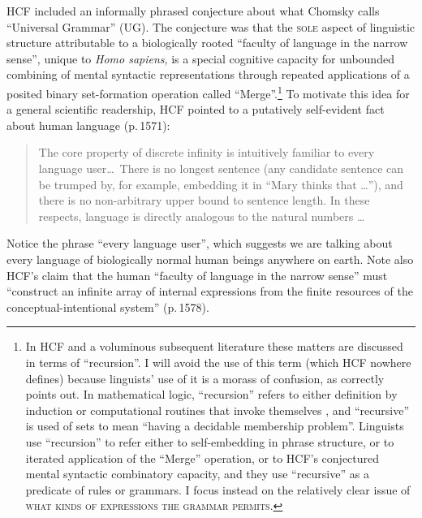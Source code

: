 \documentclass[output=paper,colorlinks,citecolor=brown
]{langscibook}
\begin{document}
HCF included an informally phrased conjecture about what Chomsky calls
``Universal Grammar'' (UG). The conjecture was that the \textsc{sole}
aspect of linguistic structure attributable to a biologically rooted
``faculty of language in the narrow sense'', unique to \textit{Homo sapiens},
is a special cognitive capacity for unbounded combining of mental
syntactic representations through repeated applications of a posited
binary set-formation operation called ``Merge''.\footnote{\label{recursion}
   In HCF and a voluminous subsequent literature these matters are discussed
   in terms of ``recursion''. I will avoid the use of this term (which
   HCF nowhere defines) because linguists' use of it is a morass of
   confusion, as \citet{Lobina14} correctly points out. In mathematical
   logic, ``recursion'' refers to either definition by induction or
   computational routines that invoke themselves \citep[esp.\ 286--289]{Soare96}, and ``recursive'' is used of sets to mean ``having
   a decidable membership problem''.
   Linguists use ``recursion'' to refer either to self-embedding in
   phrase structure, or to iterated application of the ``Merge''
   operation, or to HCF's conjectured mental syntactic combinatory
   capacity, and they use ``recursive'' as a predicate of rules or
   grammars. I focus instead on the relatively clear issue of
   \textsc{what kinds of expressions the grammar permits}.}
To motivate this idea for a general scientific readership, HCF pointed
to a putatively self-evident fact about human language (p.\,1571):

\begin{quote}
The core property of discrete infinity is intuitively familiar to every
language user\ldots\ There is no longest sentence (any candidate sentence
can be trumped by, for example, embedding it in ``Mary thinks that \ldots''),
and there is no non-arbitrary upper bound to sentence length. In these
respects, language is directly analogous to the natural numbers \ldots
\end{quote}
Notice the phrase ``every language user'', which suggests we are talking
about every language of biologically normal human beings anywhere on
earth. Note also HCF's claim that the human ``faculty of language in the
narrow sense'' must ``construct an infinite array of internal expressions
from the finite resources of the conceptual-intentional system'' (p.\,1578).
\end{document}
